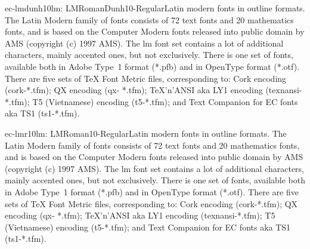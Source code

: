 \documentclass{ddltxtyp}
\begin{document}
\begin{package}{ec-lmdunh10}{lm: LMRomanDunh10-Regular}{Latin modern fonts in outline formats.}
The Latin Modern family of fonts consists of 72 text fonts and
20 mathematics fonts, and is based on the Computer Modern fonts
released into public domain by AMS (copyright (c) 1997 AMS).
The lm font set contains a lot of additional characters, mainly
accented ones, but not exclusively. There is one set of fonts,
available both in Adobe Type~1 format (*.pfb) and in OpenType
format (*.otf). There are five sets of {\TeX} Font Metric files,
corresponding to: Cork encoding (cork-*.tfm); QX encoding (qx-
*.tfm); {\TeX}'n'ANSI aka LY1 encoding (texnansi-*.tfm); T5
(Vietnamese) encoding (t5-*.tfm); and Text Companion for EC
fonts aka TS1 (ts1-*.tfm).
\end{package}
\begin{package}{ec-lmr10}{lm: LMRoman10-Regular}{Latin modern fonts in outline formats.}
The Latin Modern family of fonts consists of 72 text fonts and
20 mathematics fonts, and is based on the Computer Modern fonts
released into public domain by AMS (copyright (c) 1997 AMS).
The lm font set contains a lot of additional characters, mainly
accented ones, but not exclusively. There is one set of fonts,
available both in Adobe Type~1 format (*.pfb) and in OpenType
format (*.otf). There are five sets of {\TeX} Font Metric files,
corresponding to: Cork encoding (cork-*.tfm); QX encoding (qx-
*.tfm); {\TeX}'n'ANSI aka LY1 encoding (texnansi-*.tfm); T5
(Vietnamese) encoding (t5-*.tfm); and Text Companion for EC
fonts aka TS1 (ts1-*.tfm).
\end{package}
\end{document}
